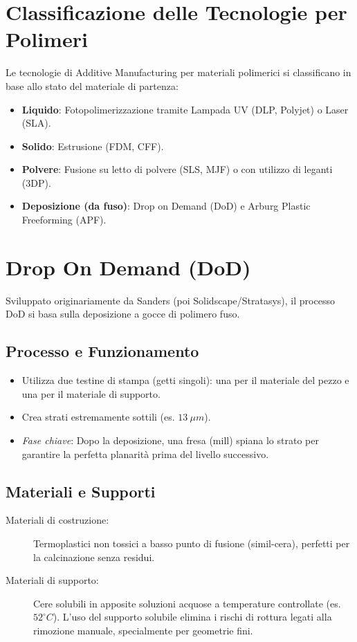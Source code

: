 %
\section{Classificazione delle Tecnologie per Polimeri}
Le tecnologie di Additive Manufacturing per materiali polimerici si classificano in base allo stato del materiale di partenza:
\begin{itemize}
    \item \textbf{Liquido}: Fotopolimerizzazione tramite Lampada UV (DLP, Polyjet) o Laser (SLA).
    \item \textbf{Solido}: Estrusione (FDM, CFF).
    \item \textbf{Polvere}: Fusione su letto di polvere (SLS, MJF) o con utilizzo di leganti (3DP).
    \item \textbf{Deposizione (da fuso)}: Drop on Demand (DoD) e Arburg Plastic Freeforming (APF).
\end{itemize}

%
\section{Drop On Demand (DoD)}
Sviluppato originariamente da Sanders (poi Solidscape/Stratasys), il processo DoD si basa sulla deposizione a gocce di polimero fuso.

\subsection{Processo e Funzionamento}
\begin{itemize}
    \item Utilizza due testine di stampa (getti singoli): una per il materiale del pezzo e una per il materiale di supporto.
    \item Crea strati estremamente sottili (es. $13~\mu m$).
    \item \emph{Fase chiave}: Dopo la deposizione, una fresa (mill) spiana lo strato per garantire la perfetta planarità prima del livello successivo.
\end{itemize}

\subsection{Materiali e Supporti}
\begin{description}
    \item[Materiali di costruzione:] Termoplastici non tossici a basso punto di fusione (simil-cera), perfetti per la calcinazione senza residui.
    \item[Materiali di supporto:] Cere solubili in apposite soluzioni acquose a temperature controllate (es. $52^{\circ}C$). L'uso del supporto solubile elimina i rischi di rottura legati alla rimozione manuale, specialmente per geometrie fini.
\end{description}


